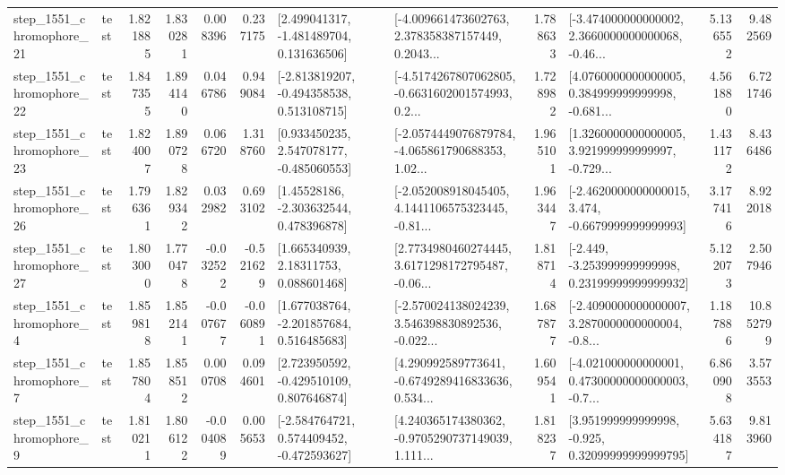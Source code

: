\begin{tabular}{llrrrrllrlrr}
 step\_1551\_chromophore\_21 &      test &      1.821885 &    1.830281 &      0.008396 &  0.237175 &    [2.499041317, -1.481489704, 0.131636506] &  [-4.009661473602763, 2.378358387157449, 0.2043... &       1.788633 &  [-3.474000000000002, 2.3660000000000068, -0.46... &            5.136552 &          9.482569 \\
 step\_1551\_chromophore\_22 &      test &      1.847355 &    1.894140 &      0.046786 &  0.949084 &   [-2.813819207, -0.494358538, 0.513108715] &  [-4.5174267807062805, -0.6631602001574993, 0.2... &       1.728982 &  [4.0760000000000005, 0.384999999999998, -0.681... &            4.561880 &          6.721746 \\
 step\_1551\_chromophore\_23 &      test &      1.824007 &    1.890728 &      0.066720 &  1.318760 &    [0.933450235, 2.547078177, -0.485060553] &  [-2.0574449076879784, -4.065861790688353, 1.02... &       1.965101 &  [1.3260000000000005, 3.921999999999997, -0.729... &            1.431172 &          8.436486 \\
 step\_1551\_chromophore\_26 &      test &      1.796361 &    1.829342 &      0.032982 &  0.693102 &     [1.45528186, -2.303632544, 0.478396878] &  [-2.052008918045405, 4.1441106575323445, -0.81... &       1.963447 &  [-2.4620000000000015, 3.474, -0.6679999999999993] &            3.177416 &          8.922018 \\
 step\_1551\_chromophore\_27 &      test &      1.803000 &    1.770478 &     -0.032522 & -0.521629 &      [1.665340939, 2.18311753, 0.088601468] &  [2.7734980460274445, 3.6171298172795487, -0.06... &       1.818714 &  [-2.449, -3.253999999999998, 0.23199999999999932] &            5.122073 &          2.507946 \\
  step\_1551\_chromophore\_4 &      test &      1.859818 &    1.852141 &     -0.007677 & -0.060891 &    [1.677038764, -2.201857684, 0.516485683] &  [-2.570024138024239, 3.546398830892536, -0.022... &       1.687877 &  [-2.4090000000000007, 3.2870000000000004, -0.8... &            1.187886 &         10.852799 \\
  step\_1551\_chromophore\_7 &      test &      1.857804 &    1.858512 &      0.000708 &  0.094601 &    [2.723950592, -0.429510109, 0.807646874] &  [4.290992589773641, -0.6749289416833636, 0.534... &       1.609541 &  [-4.021000000000001, 0.47300000000000003, -0.7... &            6.860908 &          3.573553 \\
  step\_1551\_chromophore\_9 &      test &      1.810211 &    1.806122 &     -0.004089 &  0.005653 &   [-2.584764721, 0.574409452, -0.472593627] &  [4.240365174380362, -0.9705290737149039, 1.111... &       1.818237 &   [3.951999999999998, -0.925, 0.32099999999999795] &            5.634187 &          9.813960 \\

\end{tabular}
